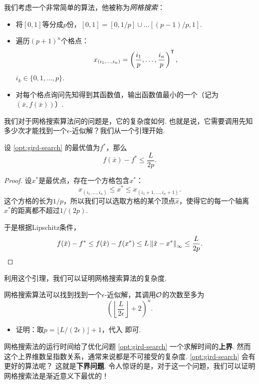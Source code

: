 我们考虑一个非常简单的算法，他被称为\emph{网格搜索}：
\begin{itemize}
    \item 将$[0,1]$等分成$p$份，$[0,1]=[0,1/p]\cup\dots[(p-1)/p,1]$.
    \item 遍历$(p+1)^n$个格点：
    \[x_{(i_1,\dots,i_n)}=\left(\frac{i_1}{p},\dots,\frac{i_n}{p}\right)^{\mathsf{T}},\]
    $i_k\in\{0,1,\dots,p\}$.
    \item 对每个格点询问先知得到其函数值，输出函数值最小的一个（记为$(\bar{x},f(\bar x))$）.
\end{itemize}

我们对于网格搜索算法问的问题是，它的复杂度如何. 也就是说，它需要调用先知多少次才能找到一个$\epsilon$-近似解？我们从一个引理开始. 

\begin{lemma}\label{lemma:gird-search}
    设 \eqref{opt:gird-search} 的最优值为$f^*$，那么
\[f(\bar x)-f^*\leq\frac{L}{2p}.\]
\end{lemma}
\begin{proof}
设$x^*$是最优点，存在一个方格包含$x^*$：
\[x_{(i_1,\dots,i_n)}\leq x^*\leq x_{(i_1+1,\dots,i_n+1)}.\]
这个方格的长为$1/p$，所以我们可以选取方格的某个顶点$\hat x$，使得它的每一个轴离$x^*$的距离都不超过$1/(2p)$.

于是根据Lipschitz条件，
    \[f(\bar x)-f^*\leq f(\hat x)-f(x^*)\leq L\left\|\hat x- x^*\right\|_\infty\leq \frac{L}{2p}.\]
\end{proof}

利用这个引理，我们可以证明网格搜索算法的复杂度.
\begin{theorem}
    网格搜索算法可以找到找到一个$\epsilon$-近似解，其调用$\mathcal{O}$的次数至多为
    \[\left(\left\lfloor\frac{L}{2\epsilon}\right\rfloor+2\right)^n.\]
\end{theorem}
\begin{itemize}
    \item 证明：取$p=\lfloor L/(2\epsilon)\rfloor+1$，代入 即可.
\end{itemize}

 网格搜索法的运行时间给了优化问题 \eqref{opt:gird-search} 一个求解时间的\textbf{上界}. 然而这个上界维数呈指数关系，通常来说都是不可接受的复杂度. \eqref{opt:gird-search} 会有更好的算法呢？ 这就是\textbf{下界问题}. 令人惊讶的是，对于这一个问题，我们可以证明网格搜索法是渐近意义下最优的！

